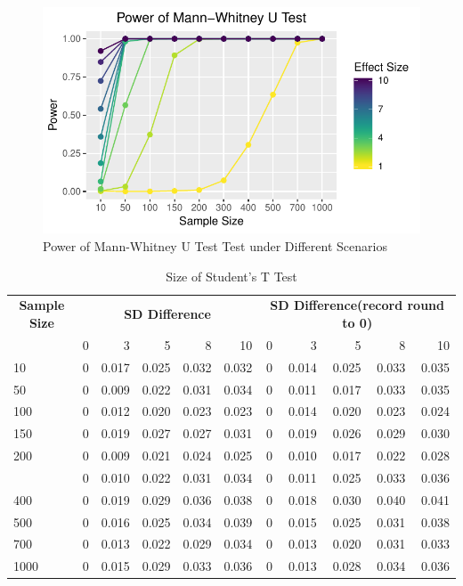 \documentclass[]{article}
\begin{document}
\begin{figure}
\centering
\includegraphics{../figure/power_mw.pdf}
\caption{Power of Mann-Whitney U Test Test under Different Scenarios}
\end{figure}

\begin{table}

\caption{\label{tab:size-tables}Size of Student's T Test}
\centering
\begin{tabular}[t]{lrrrrrrrrrr}
\toprule
\multicolumn{1}{c}{\bfseries Sample Size} & \multicolumn{5}{c}{\bfseries SD Difference} & \multicolumn{5}{c}{\bfseries SD Difference(record round to 0)} \\
\cmidrule(l{2pt}r{2pt}){1-1} \cmidrule(l{2pt}r{2pt}){2-6} \cmidrule(l{2pt}r{2pt}){7-11}
  & 0 & 3 & 5 & 8 & 10 & 0 & 3 & 5 & 8 & 10\\
\midrule
10 & 0 & 0.017 & 0.025 & 0.032 & 0.032 & 0 & 0.014 & 0.025 & 0.033 & 0.035\\
50 & 0 & 0.009 & 0.022 & 0.031 & 0.034 & 0 & 0.011 & 0.017 & 0.033 & 0.035\\
100 & 0 & 0.012 & 0.020 & 0.023 & 0.023 & 0 & 0.014 & 0.020 & 0.023 & 0.024\\
150 & 0 & 0.019 & 0.027 & 0.027 & 0.031 & 0 & 0.019 & 0.026 & 0.029 & 0.030\\
200 & 0 & 0.009 & 0.021 & 0.024 & 0.025 & 0 & 0.010 & 0.017 & 0.022 & 0.028\\
\addlinespace
300 & 0 & 0.010 & 0.022 & 0.031 & 0.034 & 0 & 0.011 & 0.025 & 0.033 & 0.036\\
400 & 0 & 0.019 & 0.029 & 0.036 & 0.038 & 0 & 0.018 & 0.030 & 0.040 & 0.041\\
500 & 0 & 0.016 & 0.025 & 0.034 & 0.039 & 0 & 0.015 & 0.025 & 0.031 & 0.038\\
700 & 0 & 0.013 & 0.022 & 0.029 & 0.034 & 0 & 0.013 & 0.020 & 0.031 & 0.033\\
1000 & 0 & 0.015 & 0.029 & 0.033 & 0.036 & 0 & 0.013 & 0.028 & 0.034 & 0.036\\
\bottomrule
\end{tabular}
\end{table}
\end{document}
